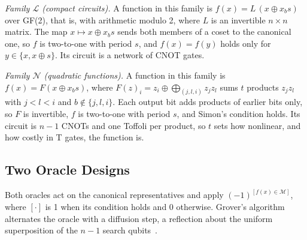 \documentclass[journal]{IEEEtran}
\newcommand{\famL}{\mathcal{L}}
\newcommand{\famN}{\mathcal{N}}
\begin{document}
\textit{Family $\famL$ (compact circuits).} A function in this family is
$f(x)=L\,(x\oplus x_b s)$ over GF(2), that is, with arithmetic modulo 2, where
$L$ is an invertible $n\times n$ matrix. The map $x\mapsto x\oplus x_b s$ sends both members of a coset to the
canonical one, so $f$ is two-to-one with period $s$, and $f(x)=f(y)$ holds only
for $y\in\{x,x\oplus s\}$. Its circuit is a network of CNOT gates.

\textit{Family $\famN$ (quadratic functions).} A function in this family is
$f(x)=F(x\oplus x_b s)$, where $F(z)_i=z_i\oplus\bigoplus_{(j,l,i)}z_jz_l$ sums
$t$ products $z_jz_l$ with $j<l<i$ and $b\notin\{j,l,i\}$. Each output bit adds
products of earlier bits only, so $F$ is invertible, $f$ is two-to-one with
period $s$, and Simon's condition holds. Its circuit is $n-1$ CNOTs and one
Toffoli per product, so $t$ sets how nonlinear, and how costly in T gates, the
function is.

\subsection{Two Oracle Designs}
\label{sec:styles}

Both oracles act on the canonical representatives and apply
$(-1)^{[f(x)\in\mathcal{M}]}$, where $[\cdot]$ is 1 when its condition holds and
0 otherwise. Grover's algorithm alternates the oracle with a diffusion step, a
reflection about the uniform superposition of the $n-1$ search
qubits~\cite{brassard2002amplitude}.
\end{document}
